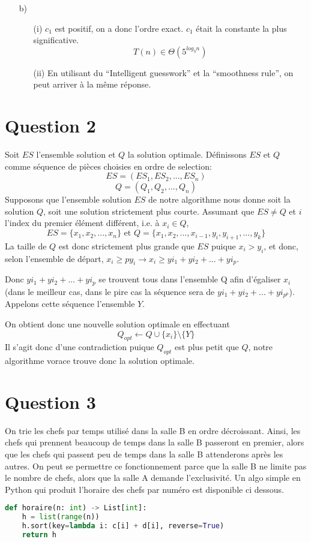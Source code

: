 \documentclass[10pt,letterpaper]{article}
\begin{document}
\begin{enumerate}
		\item[b)]
		
		\begin{enumerate}
			\item[(i)] 
			$c_1$ est positif, on a donc l'ordre exact. $c_1$ était la constante la plus significative.
			$$T(n) \in \Theta(5^{log_3 n})$$
			\item[(ii)] En utilisant du ``Intelligent guesswork'' et la ``smoothness rule'', on peut arriver à la même réponse.
		\end{enumerate}
	\end{enumerate}

	\section*{Question 2}
	Soit $ES$ l'ensemble solution et $Q$ la solution optimale. Définissons $ES$ et $Q$ comme séquence de pièces choisies en ordre de selection:
	$$ES = (ES_1, ES_2, ..., ES_n)$$
	$$Q = (Q_1, Q_2, ..., Q_n)$$
	Supposons que l'ensemble solution $ES$ de notre algorithme nous donne soit la solution $Q$, soit une solution strictement plus courte.
	Assumant que $ES\ne Q$ et $i$ l'index du premier élément différent, i.e. à $x_i \in Q$,
	$$ES = \{x_1, x_2, ..., x_n\} \text{ et } Q = \{x_1, x_2, ..., x_{i-1}, y_i, y_{i+1}, ..., y_k\}$$
	La taille de $Q$ est donc strictement plus grande que $ES$ puique $x_i > y_i$, et donc, selon l'ensemble de départ, $x_i \ge py_i \rightarrow x_i \ge yi_1 + yi_2 + ... + yi_p$.
	
	Donc $yi_1 + yi_2 + ... + yi_p$ se trouvent tous dans l'ensemble Q afin d'égaliser $x_i$ (dans le meilleur cas, dans le pire cas la séquence sera de $yi_1 + yi_2 + ... + yi_{p^p}$). Appelons cette séquence l'ensemble $Y$.
	
	On obtient donc une nouvelle solution optimale en effectuant
	$$Q_{opt} \leftarrow Q \cup \{x_i\} \setminus \{Y\}$$
	Il s'agit donc d'une contradiction puique $Q_{opt}$ est plus petit que $Q$, notre algorithme vorace trouve donc la solution optimale.
	
	\section*{Question 3}
	On trie les chefs par temps utilisé dans la salle B en ordre décroissant. Ainsi, les chefs qui prennent
	beaucoup de temps dans la salle B passeront en premier, alors que les chefs qui passent peu de temps dans la salle B attenderons après les autres. On peut se permettre ce fonctionnement parce que la salle B ne limite pas le nombre de chefs, alors que la salle A demande l'exclusivité. Un algo simple en Python qui produit l'horaire des chefs par numéro est disponible ci dessous.
	\begin{lstlisting}[language=Python]
def horaire(n: int) -> List[int]:
	h = list(range(n))
	h.sort(key=lambda i: c[i] + d[i], reverse=True)
	return h
	\end{lstlisting}	
\end{document}
